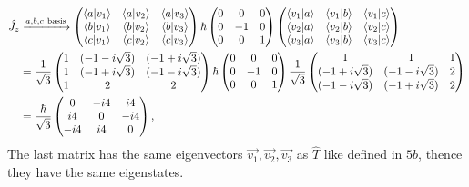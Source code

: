 \documentclass[
	12pt,
	]{article}
\theoremstyle{definition}
\theoremstyle{definition}
\theoremstyle{definition}
\theoremstyle{definition}
\theoremstyle{definition}
\theoremstyle{example}
\theoremstyle{note}
\theoremstyle{remark}
\theoremstyle{example}
\begin{document}
				\begin{align*}
				 \hat{J}_{z} &\xrightarrow{a,b,c \ \text{basis}}  \begin{pmatrix}
					\braket{a}{v_{1}} & \braket{a}{v_{2}} & \braket{a}{v_{3}} \\
					\braket{b}{v_{1}} & \braket{b}{v_{2}} & \braket{b}{v_{3}} \\
					\braket{c}{v_{1}} & \braket{c}{v_{2}} & \braket{c}{v_{3}} 
				\end{pmatrix}
				\hbar
				\begin{pmatrix}
					0 & 0 & 0 \\ 0 & -1 & 0 \\ 0 & 0 & 1
				\end{pmatrix}
				\begin{pmatrix}
				\braket{v_{1}}{a} & \braket{v_{1}}{b} & \braket{v_{1}}{c} \\
				\braket{v_{2}}{a} & \braket{v_{2}}{b} & \braket{v_{2}}{c} \\
				\braket{v_{3}}{a} & \braket{v_{3}}{b} & \braket{v_{3}}{c} 
				\end{pmatrix}\\
				&= \frac{1}{\sqrt{3}}\begin{pmatrix}
					1 & (-1-i \sqrt{3}) & (-1 + i\sqrt{3}) \\
					1 & (-1+i\sqrt{3}) & (-1-i\sqrt{3}) \\
					1 & 2 & 2
				\end{pmatrix}
				\hbar 
				\begin{pmatrix}
					0 & 0 & 0 \\ 
					0 & -1 & 0 \\
					0 & 0 & 1
				\end{pmatrix}
				\frac{1}{\sqrt{3}}
				\begin{pmatrix}
					1 & 1 & 1\\
					(-1+i \sqrt{3}) & (-1-i \sqrt{3}) & 2 \\
					(-1-i\sqrt{3}) & (-1 +i \sqrt{3}) & 2 \\
				\end{pmatrix}\\ 
				&= \frac{\hbar }{\sqrt{3}}
				\begin{pmatrix}
					0 & -i 4 & i 4\\
					i4 & 0 & -i 4\\
					-i 4 & i 4 & 0
				\end{pmatrix},
				\end{align*}
				The last matrix has the same eigenvectors $\vec{v_{1}}, \vec{v_{2}} ,\vec{v_{3}}$ as $\hat{T}$ like defined in $5b$, thence they have the same eigenstates.
	
\end{document}
